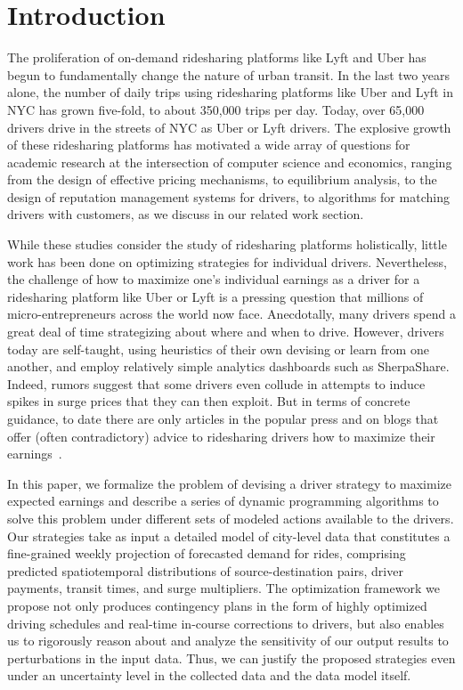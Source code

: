 
\section{Introduction}
\label{sec:introduction}

The proliferation of on-demand ridesharing platforms like Lyft and Uber
  has begun to fundamentally change the nature of urban transit. 
In the last two years alone, the number of daily trips using ridesharing 
  platforms like Uber and Lyft in NYC has grown five-fold, 
  to about 350,000 trips per day. 
Today, over 65,000 drivers drive in the streets of NYC as Uber or Lyft drivers.
The explosive growth of these ridesharing platforms has motivated a wide
  array of questions for academic research at the intersection of computer
  science and economics, ranging from the design of effective pricing mechanisms, 
  to equilibrium analysis, to the design of reputation management systems for 
  drivers, to algorithms for matching drivers with 
  customers, as we discuss in our related work section.

While these studies consider the study of ridesharing platforms holistically, 
   little work has been done on optimizing strategies for individual drivers. 
Nevertheless, the challenge of how to maximize one's individual earnings as a driver for a 
ridesharing platform like Uber or Lyft is a pressing question that millions of micro-entrepreneurs 
across the world now face.  Anecdotally, many drivers spend a great deal of time 
strategizing about where and when to drive.  However, drivers today are 
self-taught, using heuristics of their own devising or learn from one another, 
and employ relatively simple analytics dashboards such as SherpaShare.
Indeed, rumors suggest that some drivers even collude in attempts to induce spikes in surge prices that they can then exploit.
But in terms of concrete guidance, to date there are only articles in the
  popular press and on blogs that offer (often contradictory) advice to ridesharing drivers 
  how to maximize their earnings~\cite{dont,tips,sherpashareNYT}.

In this paper, we formalize the problem of devising a driver strategy to maximize expected 
 earnings and describe a series of dynamic programming algorithms to solve this problem
 under different sets of modeled actions available to the drivers. 
Our strategies take as input a detailed model of city-level data that constitutes a 
  fine-grained weekly projection of forecasted demand for rides, comprising 
  predicted spatiotemporal distributions of source-destination pairs, driver payments,
  transit times, and surge multipliers. 
The optimization framework we propose not only produces contingency plans in the form of
  highly optimized driving schedules and real-time in-course corrections to drivers, but 
  also enables us to rigorously reason about and analyze the sensitivity of our output 
  results to perturbations in the input data.  
Thus, we can justify the proposed strategies even under an uncertainty level in the
  collected data and the data model itself.
  
